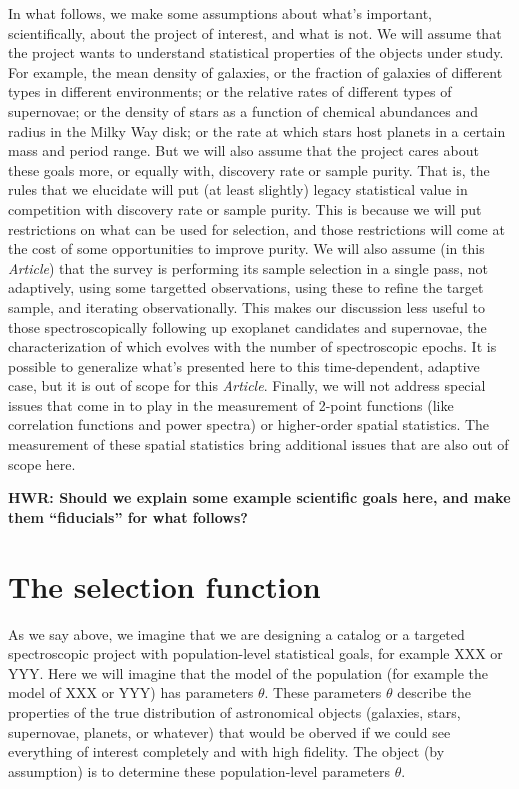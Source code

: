 \documentclass[modern]{aastex62}
\newcommand{\documentname}{\textsl{Article}}
\begin{document}
In what follows, we make some assumptions about what's important,
scientifically, about the project of interest, and what is not.
We will assume that the project wants to understand statistical properties
of the objects under study.
For example, the mean density of galaxies, or the fraction of galaxies
of different types in different environments;
or the relative rates of different types of supernovae;
or the density of stars as a function of chemical abundances and radius in the Milky Way disk;
or the rate at which stars host planets in a certain mass and period range.
But we will also assume that the project cares about these goals more,
or equally with, discovery rate or sample purity.
That is, the rules that we elucidate will put (at least slightly)
legacy statistical value in competition with discovery rate or sample
purity.
This is because we will put restrictions on what can be used for
selection, and those restrictions will come at the cost of some
opportunities to improve purity.
We will also assume (in this \documentname) that the survey is performing
its sample selection in a single pass, not adaptively, using some
targetted observations, using these to refine the target sample, and
iterating observationally.
This makes our discussion less useful to those spectroscopically following up exoplanet
candidates and supernovae, the characterization of which evolves with
the number of spectroscopic epochs.
It is possible to generalize what's presented here to this time-dependent, adaptive
case, but it is out of scope for this \documentname.
Finally, we will not address special issues that come in to play in the
measurement of 2-point functions (like correlation functions and power
spectra) or higher-order spatial statistics.
The measurement of these spatial statistics bring additional issues
that are also out of scope here.

\textbf{HWR: Should we explain some example scientific goals here, and make
them ``fiducials'' for what follows?}

\section{The selection function}

As we say above, we imagine that we are designing a catalog or a targeted
spectroscopic project
with population-level statistical goals, for example XXX or YYY.
Here we will imagine that the model of the population (for example the model
of XXX or YYY) has parameters $\theta$.
These parameters $\theta$ describe the properties of the true distribution
of astronomical objects (galaxies, stars, supernovae, planets, or whatever)
that would be oberved if we could see everything of interest completely and
with high fidelity.
The object (by assumption) is to determine these population-level parameters
$\theta$.
\end{document}
